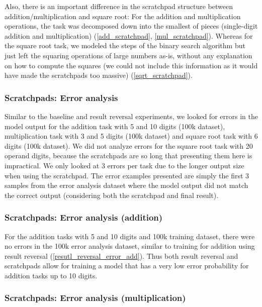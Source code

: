 Also, there is an important difference in the scratchpad structure between addition/multiplication and square root: For the addition and multiplication operations, the task was decomposed down into the smallest of pieces (single-digit addition and multiplication) (\cref{add_scratchpad}, \cref{mul_scratchpad}). Whereas for the square root task, we modeled the steps of the binary search algorithm but just left the squaring operations of large numbers as-is, without any explanation on how to compute the squares (we could not include this information as it would have made the scratchpads too massive) (\cref{sqrt_scratchpad}).

\subsubsection{Scratchpads: Error analysis}

Similar to the baseline and result reversal experiments, we looked for errors in the model output for the addition task with 5 and 10 digits (100k dataset), multiplication task with 3 and 5 digits (100k dataset) and square root task with 6 digits (100k dataset).
We did not analyze errors for the square root task with 20 operand digits, because the scratchpads are so long that presenting them here is impractical.
We only looked at 3 errors per task due to the longer output size when using the scratchpad. The error examples presented are simply the first 3 samples from the error analysis dataset where the model output did not match the correct output (considering both the scratchpad and final result).

\subsubsection{Scratchpads: Error analysis (addition)}

For the addition tasks with 5 and 10 digits and 100k training dataset, there were no errors in the 100k error analysis dataset, similar to training for addition using result reversal (\cref{resutl_reversal_error_add}).
Thus both result reversal and scratchpads allow for training a model that has a very low error probability for addition tasks up to 10 digits.

\subsubsection{Scratchpads: Error analysis (multiplication)}


\ErrorAnalysisTableBegin

